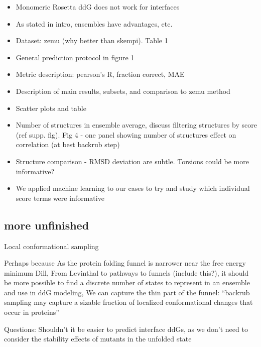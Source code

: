 \begin{itemize}
\item Monomeric Rosetta ddG does not work for interfaces
\item As stated in intro, ensembles have advantages, etc.
\item Dataset: zemu (why better than skempi). Table 1
\item General prediction protocol in figure 1
\item Metric description: pearson’s R, fraction correct, MAE
\item Description of main results, subsets, and comparison to zemu method
\item Scatter plots and table
\item Number of structures in ensemble average, discuss filtering structures by score (ref supp. fig). Fig 4 - one panel showing number of structures effect on correlation (at best backrub step)
\item Structure comparison - RMSD deviation are subtle. Torsions could be more informative?
\item We applied machine learning to our cases to try and study which individual score terms were informative
\end{itemize}

\subsection{more unfinished}
Local conformational sampling

Perhaps because
As the protein folding funnel is narrower near the free energy minimum {Dill, From Levinthal to pathways to funnels (include this?)}, it should be more possible to find a discrete number of states to represent in an ensemble and use in ddG modeling,
We can capture the thin part of the funnel:
“backrub sampling may capture a sizable fraction of localized conformational changes that occur in proteins” \cite{humphris_prediction_2008}

Questions:
Shouldn’t it be easier to predict interface ddGs, as we don’t need to consider the stability effects of mutants in the unfolded state
